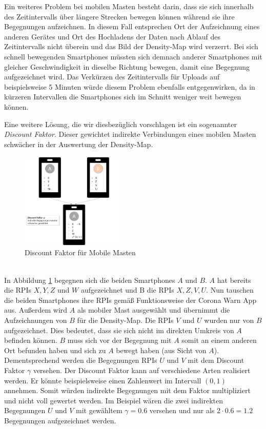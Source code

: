 \documentclass[conference,compsoc]{IEEEtran}
\begin{document}
Ein weiteres Problem bei mobilen Masten besteht darin, dass sie sich innerhalb des Zeitintervalls über längere Strecken bewegen können während sie ihre Begegnungen aufzeichnen.
In diesem Fall entsprechen Ort der Aufzeichnung eines anderen Gerätes und Ort des Hochladens der Daten nach Ablauf des Zeitintervalls nicht überein und das Bild der Density-Map wird verzerrt. 
Bei sich schnell bewegenden Smartphones müssten sich demnach anderer Smartphones mit gleicher Geschwindigkeit in dieselbe Richtung bewegen, damit eine Begegnung aufgezeichnet wird. 
Das Verkürzen des Zeitintervalls für Uploads auf beispielsweise 5 Minuten würde diesem Problem ebenfalls entgegenwirken, da in kürzeren Intervallen die Smartphones sich im Schnitt weniger weit bewegen können.

Eine weitere Lösung, die wir diesbezüglich vorschlagen ist ein sogenannter \textit{Discount Faktor}. 
Dieser gewichtet indirekte Verbindungen eines mobilen Masten schwächer in der Auswertung der Density-Map. \\
\begin{figure}[h]
	\centering
	\includegraphics[width=0.45\textwidth]{"Discount_Faktor"}
	\caption{Discount Faktor für Mobile Masten}
	\label{disc_factor}
\end{figure} \\
In Abbildung \ref{disc_factor} begegnen sich die beiden Smartphones $A$ und $B$. $A$ hat bereits die RPIs $X, Y, Z$ und $W$ aufgezeichnet und B die RPIs $X, Z, V, U$. 
Nun tauschen die beiden Smartphones ihre RPIs gemäß Funktionsweise der Corona Warn App aus. Außerdem wird $A$ als mobiler Mast ausgewählt und übernimmt die Aufzeichnungen von $B$ für die Density-Map.
Die RPIs $V$ und $U$ wurden nur von $B$ aufgezeichnet. Dies bedeutet, dass sie sich nicht im direkten Umkreis von $A$ befinden können. 
$B$ muss sich vor der Begegnung mit $A$ somit an einem anderen Ort befunden haben und sich zu $A$ bewegt haben (aus Sicht von $A$).
Dementsprechend werden die Begegnungen RPIs $U$ und $V$ mit dem Discount Faktor $\gamma$ versehen.
Der Discount Faktor kann auf verschiedene Arten realisiert werden. Er könnte beispielsweise einen Zahlenwert im Intervall $(0,1)$ annehmen. 
Somit würden indirekte Begegnungen mit dem Faktor multipliziert und nicht voll gewertet werden. 
Im Beispiel wären die zwei indirekten Begegnungen $U$ und $V$ mit gewähltem $\gamma = 0.6$ versehen und nur als $2 \cdot 0.6 = 1.2$ Begegnungen aufgezeichnet werden.
\end{document}
